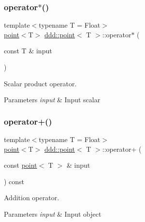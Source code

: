 \subsubsection{\texorpdfstring{operator$\ast$()}{operator*()}}
{\footnotesize\ttfamily template$<$typename T = Float$>$ \\
\hyperlink{classddd_1_1point}{point}$<$T$>$ \hyperlink{classddd_1_1point}{ddd\+::point}$<$ T $>$\+::operator$\ast$ (\begin{DoxyParamCaption}\item[{const T \&}]{input }\end{DoxyParamCaption})\hspace{0.3cm}{\ttfamily [inline]}}



Scalar product operator. 


\begin{DoxyParams}{Parameters}
{\em input} & Input scalar \\
\hline
\end{DoxyParams}
\mbox{\label{classddd_1_1point_ab0b0c990b117bb889d34d44509b645be}} 
\subsubsection{\texorpdfstring{operator+()}{operator+()}}
{\footnotesize\ttfamily template$<$typename T = Float$>$ \\
\hyperlink{classddd_1_1point}{point}$<$T$>$ \hyperlink{classddd_1_1point}{ddd\+::point}$<$ T $>$\+::operator+ (\begin{DoxyParamCaption}\item[{const \hyperlink{classddd_1_1point}{point}$<$ T $>$ \&}]{input }\end{DoxyParamCaption}) const\hspace{0.3cm}{\ttfamily [inline]}}



Addition operator. 


\begin{DoxyParams}{Parameters}
{\em input} & Input object \\
\hline
\end{DoxyParams}
\mbox{\label{classddd_1_1point_a5621f5a883c88d5588e09f9ff0de6575}} 
